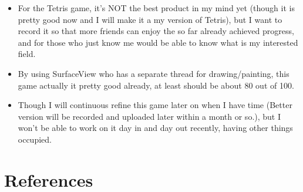 \documentclass[9pt,b5paper]{article}
\begin{document}
\begin{itemize}
\item For the Tetris game, it's NOT the best product in my mind yet (though it is pretty good now and I will make it a my version of Tetris), but I want to record it so that more friends can enjoy the so far already achieved progress, and for those who just know me would be able to know what is my interested field.
\item By using SurfaceView who has a separate thread for drawing/painting, this game actually it pretty good already, at least should be about 80 out of 100.
\item Though I will continuous refine this game later on when I have time (Better version will be recorded and uploaded later within a month or so.), but I won't be able to work on it day in and day out recently, having other things occupied.
\end{itemize}

\section{References}
\label{sec-2}
\end{document}
